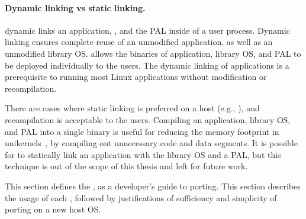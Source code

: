 \paragraph{Dynamic linking vs static linking.}
\graphene{} dynamic links an application, \libos{}, and the PAL inside of a user process.
Dynamic linking ensures complete reuse of an unmodified application,
as well as an unmodified library OS.
\graphene{} allows the binaries of application, library OS, and PAL to be deployed individually to the users.
The dynamic linking of applications is a prerequisite
to running most Linux applications without modification or recompilation.



There are cases where static linking is preferred on a host (e.g., \sgx{}), and recompilation is acceptable to the users.
Compiling an application, library OS, and PAL
into a single binary is useful for reducing the memory footprint in unikernels~\cite{unikernels},
by compiling out unnecessary code and data segments. 
It is possible for \graphene{} to statically link an application with the library OS and a PAL,
but this technique is out of the scope of this thesis and left for future work.



This section defines the \thehostabi{},
as a developer's guide to porting. %
This section describes 
the usage of each \hostapi{},
followed by justifications of sufficiency and simplicity of porting on a new host OS.


